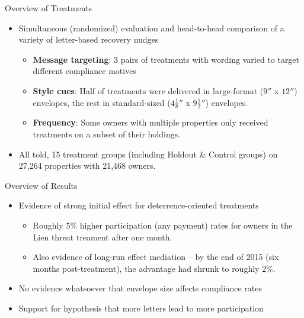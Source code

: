 \documentclass[ignorenonframetext,]{beamer}
\begin{document}
\begin{frame}{Overview of Treatments}

\begin{itemize}
\item
  Simultaneous (randomized) evaluation and head-to-head comparison of a
  variety of letter-based recovery nudges

  \begin{itemize}
  \item
    \textbf{Message targeting}: 3 pairs of treatments with wording
    varied to target different compliance motives
  \item
    \textbf{Style cues}: Half of treatments were delivered in
    large-format (\(9''\) x \(12''\)) envelopes, the rest in
    standard-sized (\(4 \frac18 ''\) x \(9 \frac12 ''\)) envelopes.
  \item
    \textbf{Frequency}: Some owners with multiple properties only
    received treatments on a subset of their holdings.
  \end{itemize}
\item
  All told, 15 treatment groups (including Holdout \& Control groups) on
  27,264 properties with 21,468 owners.
\end{itemize}

\end{frame}

\begin{frame}{Overview of Results}

\begin{itemize}
\item
  Evidence of strong initial effect for deterrence-oriented treatments

  \begin{itemize}
  \item
    Roughly 5\% higher participation (any payment) rates for owners in
    the Lien threat treament after one month.
  \item
    Also evidence of long-run effect mediation -- by the end of 2015
    (six months post-treatment), the advantage had shrunk to roughly
    2\%.
  \end{itemize}
\item
  No evidence whatsoever that envelope size affects compliance rates
\item
  Support for hypothesis that more letters lead to more participation
\end{itemize}

\end{frame}
\end{document}
